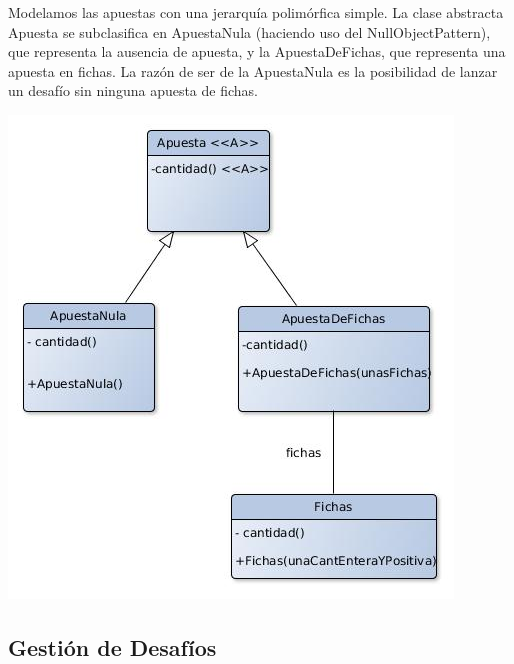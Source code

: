 Modelamos las apuestas con una jerarquía polimórfica simple. La clase abstracta Apuesta se subclasifica en ApuestaNula (haciendo uso del NullObjectPattern), que representa la ausencia de apuesta, y la ApuestaDeFichas, que representa una apuesta en fichas. La razón de ser de la ApuestaNula es la posibilidad de lanzar un desafío sin ninguna apuesta de fichas.\\
\begin{center}
\includegraphics[scale=0.4]{diseno/apuestas.jpg}
\end{center}

\subsection{Gestión de Desafíos}



